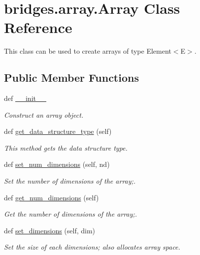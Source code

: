 \hypertarget{classbridges_1_1array_1_1_array}{}\section{bridges.\+array.\+Array Class Reference}
\label{classbridges_1_1array_1_1_array}


This class can be used to create arrays of type Element$<$\+E$>$.  


\subsection*{Public Member Functions}
\begin{DoxyCompactItemize}
\item 
def \hyperlink{classbridges_1_1array_1_1_array_a02457a54e22d0205c0e981a646a27901}{\+\_\+\+\_\+init\+\_\+\+\_\+}
\begin{DoxyCompactList}\small\item\em Construct an array object. \end{DoxyCompactList}\item 
def \hyperlink{classbridges_1_1array_1_1_array_a27dcb7a04798a215092f42506da679ce}{get\+\_\+data\+\_\+structure\+\_\+type} (self)
\begin{DoxyCompactList}\small\item\em This method gets the data structure type. \end{DoxyCompactList}\item 
def \hyperlink{classbridges_1_1array_1_1_array_adb70532d86e05bf5b9874968a804f23a}{set\+\_\+num\+\_\+dimensions} (self, nd)
\begin{DoxyCompactList}\small\item\em Set the number of dimensions of the array;. \end{DoxyCompactList}\item 
def \hyperlink{classbridges_1_1array_1_1_array_a9a98a7fedc55562af1e571f9256fefe4}{get\+\_\+num\+\_\+dimensions} (self)
\begin{DoxyCompactList}\small\item\em Get the number of dimensions of the array;. \end{DoxyCompactList}\item 
def \hyperlink{classbridges_1_1array_1_1_array_ad33c0cf22500f829d568b04b831549ec}{set\+\_\+dimensions} (self, dim)
\begin{DoxyCompactList}\small\item\em Set the size of each dimensions; also allocates array space. \end{DoxyCompactList}\item 

\end{DoxyCompactItemize}
